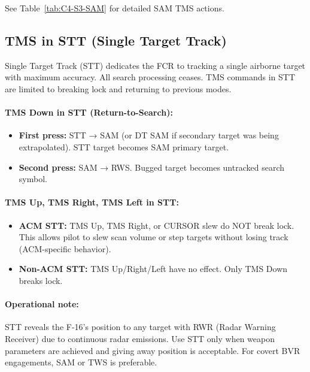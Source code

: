 \documentclass[11pt, a4paper, twoside]{report}
\begin{document}
See Table~\ref{tab:C4-S3-SAM} for detailed SAM TMS actions.

\subsection{TMS in STT (Single Target Track)}
\label{sec:C4-S3-S2}

Single Target Track (STT) dedicates the FCR to tracking a single airborne target with maximum accuracy. All search processing ceases. TMS commands in STT are limited to breaking lock and returning to previous modes.

\paragraph{TMS Down in STT (Return-to-Search):}
\begin{itemize}
    \item \textbf{First press:} STT → SAM (or DT SAM if secondary target was being extrapolated). STT target becomes SAM primary target.
    \item \textbf{Second press:} SAM → RWS. Bugged target becomes untracked search symbol.
\end{itemize}

\paragraph{TMS Up, TMS Right, TMS Left in STT:}
\begin{itemize}
    \item \textbf{ACM STT:} TMS Up, TMS Right, or CURSOR slew do NOT break lock. This allows pilot to slew scan volume or step targets without losing track (ACM-specific behavior).
    \item \textbf{Non-ACM STT:} TMS Up/Right/Left have no effect. Only TMS Down breaks lock.
\end{itemize}

\paragraph{Operational note:}
STT reveals the F-16's position to any target with RWR (Radar Warning Receiver) due to continuous radar emissions. Use STT only when weapon parameters are achieved and giving away position is acceptable. For covert BVR engagements, SAM or TWS is preferable.
\end{document}
